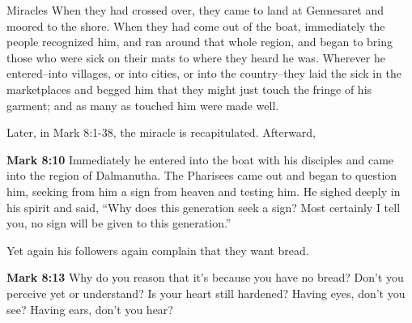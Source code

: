 \documentclass[10pt,twoside]{article} %
\newcommand{\quotesize}{\normalsize{}}
\newcommand{\comm}[1]{\begingroup \color{black!50} #1\endgroup}
\newenvironment{quotetext}{\begingroup\quotesize}{\endgroup}
\newcommand{\bible}[2]{\begin{quotetext}\textbf{#1} #2\end{quotetext}}
\newcommand{\gospelmark}[2]{\bible{Mark #1}{#2}}
\begin{document}
\begin{section}{Miracles}
{  When they had crossed over, they came to land at Gennesaret and moored to the shore.   When they had come out of the boat, immediately the people recognized him,   and ran around that whole region, and began to bring those who were sick on their mats to where they heard he was.   Wherever he entered--into villages, or into cities, or into the country--they laid the sick in the marketplaces and begged him that they might just touch the fringe of his garment; and as many as touched him were made well.
}

\comm{Later, in Mark 8:1-38, the miracle is recapitulated. Afterward,}

\gospelmark{8:10}{
Immediately he entered into the boat with his disciples and came into the region of Dalmanutha.   The Pharisees came out and began to question him, seeking from him a sign from heaven and testing him.   He sighed deeply in his spirit and said, ``Why does this generation seek a sign? Most certainly I tell you, no sign will be given to this generation.''
}

\comm{Yet again his followers again complain that they want bread.}

\gospelmark{8:13}{
Why do you reason that it's because you have no bread? Don't you perceive yet or understand? Is your heart still hardened?    Having eyes, don't you see? Having ears, don't you hear?
}

\end{section}
\end{document}
